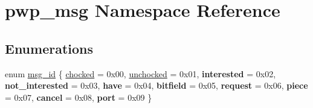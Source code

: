 \hypertarget{namespacepwp__msg}{}\section{pwp\+\_\+msg Namespace Reference}
\label{namespacepwp__msg}
\subsection*{Enumerations}
\begin{DoxyCompactItemize}
\item 
enum \hyperlink{namespacepwp__msg_a0b9a29508f00a30e5138d2b78f4b1daf}{msg\+\_\+id} \{ \newline
\hyperlink{namespacepwp__msg_a0b9a29508f00a30e5138d2b78f4b1dafae1d8b3754d66ec7fcad827fb54eaeea2}{chocked} = 0x00, 
\hyperlink{namespacepwp__msg_a0b9a29508f00a30e5138d2b78f4b1dafa55689e288bf71e7737faaf385b1c528b}{unchocked} = 0x01, 
{\bfseries interested} = 0x02, 
{\bfseries not\+\_\+interested} = 0x03, 
\newline
{\bfseries have} = 0x04, 
{\bfseries bitfield} = 0x05, 
{\bfseries request} = 0x06, 
{\bfseries piece} = 0x07, 
\newline
{\bfseries cancel} = 0x08, 
{\bfseries port} = 0x09
 \}
\end{DoxyCompactItemize}
